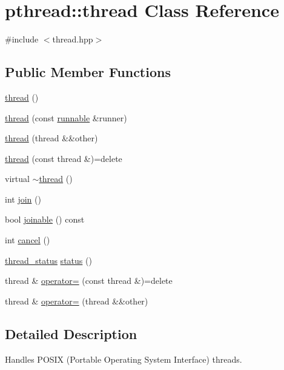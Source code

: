 \hypertarget{classpthread_1_1thread}{}\section{pthread\+:\+:thread Class Reference}
\label{classpthread_1_1thread}


{\ttfamily \#include $<$thread.\+hpp$>$}

\subsection*{Public Member Functions}
\begin{DoxyCompactItemize}
\item 
\hyperlink{classpthread_1_1thread_a60ac91ccf3de6e36258aa741af015095}{thread} ()
\item 
\hyperlink{classpthread_1_1thread_a978cf4c628ece8a58e75c70f85b043ea}{thread} (const \hyperlink{classpthread_1_1runnable}{runnable} \&runner)
\item 
\hyperlink{classpthread_1_1thread_a928b41a7587eba3e5e39237b4b2f655a}{thread} (thread \&\&other)
\item 
\hyperlink{classpthread_1_1thread_ab9ddf5aa6697287269dc2804051b6378}{thread} (const thread \&)=delete
\item 
virtual \hyperlink{classpthread_1_1thread_aa4920e15c3a033f94c6be462c5cbcecf}{$\sim$thread} ()
\item 
int \hyperlink{classpthread_1_1thread_a93c4105becf4dea1b00efb30cd7228af}{join} ()
\item 
bool \hyperlink{classpthread_1_1thread_a14b07d05a78157bcb5ee42fc8dd17e35}{joinable} () const 
\item 
int \hyperlink{classpthread_1_1thread_a89b64810871feee5c2d2659f3ae2f668}{cancel} ()
\item 
\hyperlink{namespacepthread_ac4b6e78f3d72c946ace7a92f3bec4101}{thread\+\_\+status} \hyperlink{classpthread_1_1thread_a3e49c7d73cb8411258790ed2fc0cd818}{status} ()
\item 
thread \& \hyperlink{classpthread_1_1thread_a09903f6b3f396f2ea046c9c1606f0f61}{operator=} (const thread \&)=delete
\item 
thread \& \hyperlink{classpthread_1_1thread_a8f9ab7d43ad9aee0368ccc4778cf40d0}{operator=} (thread \&\&other)
\end{DoxyCompactItemize}


\subsection{Detailed Description}
Handles P\+O\+S\+IX (Portable Operating System Interface) threads.


